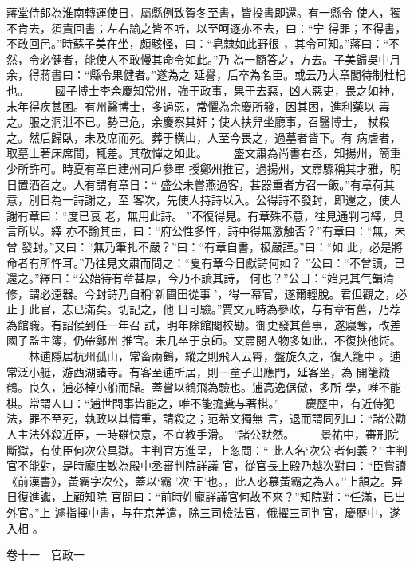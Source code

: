 \documentclass{ctexart}
\begin{document}
蔣堂侍郎為淮南轉運使日，屬縣例致賀冬至書，皆投書即還。有一縣令 使人，獨不肯去，須責回書；左右諭之皆不听，以至呵逐亦不去，曰：``宁 得罪；不得書，不敢回邑。''時蘇子美在坐，頗駭怪，曰：``皂隸如此野很 ，其令可知。''蔣曰：``不然，令必健者，能使人不敢慢其命令如此。''乃 為一簡答之，方去。子美歸吳中月余，得蔣書曰：``縣令果健者。''遂為之 延譽，后卒為名臣。或云乃大章閣待制杜杞也。 　　國子博士李余慶知常州，強于政事，果于去惡，凶人惡吏，畏之如神， 末年得疾甚困。有州醫博士，多過惡，常懼為余慶所發，因其困，進利藥以 毒之。服之洞泄不已。勢已危，余慶察其奸；使人扶舁坐廳事，召醫博士， 杖殺之。然后歸臥，未及席而死。葬于橫山，人至今畏之，過墓者皆下。有 病虐者，取墓土著床席間，輒差。其敬憚之如此。 　　盛文肅為尚書右丞，知揚州，簡重少所許可。時夏有章自建州司戶參軍 授鄭州推官，過揚州，文肅驟稱其才雅，明日置酒召之。人有謂有章日：`` 盛公未嘗燕過客，甚器重者方召一飯。''有章荷其意，別日為一詩謝之，至 客次，先使人持詩以入。公得詩不發封，即還之，使人謝有章曰：``度已衰 老，無用此詩。 ''不復得見。有章殊不意，往見通判刁繹，具言所以。繹 亦不諭其由，曰：``府公性多忤，詩中得無激触否？''有章曰：``無，未曾 發封。''又曰：``無乃筆扎不嚴？''曰：``有章自書，极嚴謹。''曰：``如 此，必是將命者有所忤耳。''乃往見文肅而問之：``夏有章今日獻詩何如？ ''公曰：``不曾讀，已還之。''繹曰：``公始待有章甚厚，今乃不讀其詩， 何也？''公日：``始見其气韻清修，謂必遠器。今封詩乃自稱`新圃田從事 '，得一幕官，遂爾輕脫。君但觀之，必止于此官，志已滿矣。切記之，他 日可驗。''賈文元時為參政，与有章有舊，乃荐為館職。有詔候到任一年召 試，明年除館閣校勘。御史發其舊事，遂寢奪，改差國子監主簿，仍帶鄭州 推官。未几卒于京師。文肅閱人物多如此，不復挾他術。 　　林逋隱居杭州孤山，常畜兩鶴，縱之則飛入云霄，盤旋久之，復入籠中 。逋常泛小艇，游西湖諸寺。有客至逋所居，則一童子出應門，延客坐，為 開籠縱鶴。良久，逋必棹小船而歸。蓋嘗以鶴飛為驗也。逋高逸倨傲，多所 學，唯不能棋。常謂人曰：``逋世間事皆能之，唯不能擔糞与著棋。'' 　　慶歷中，有近侍犯法，罪不至死，執政以其情重，請殺之；范希文獨無 言，退而謂同列曰：``諸公勸人主法外殺近臣，一時雖快意，不宜教手滑。 ''諸公默然。 　　景祐中，審刑院斷獄，有使臣何次公具獄。主判官方進呈，上忽問：`` 此人名`次公'者何義？''主判官不能對，是時龐庄敏為殿中丞審判院詳議 官，從官長上殿乃越次對曰：``臣嘗讀《前漢書》，黃霸字次公，蓋以`霸 '次`王'也。，此人必慕黃霸之為人。''上頷之。异日復進讞，上顧知院 官問曰：``前時姓龐詳議官何故不來？''知院對：``任滿，已出外官。''上 遽指揮中書，与在京差遣，除三司檢法官，俄擢三司判官，慶歷中，遂入相 。

卷十一　官政一
\end{document}
